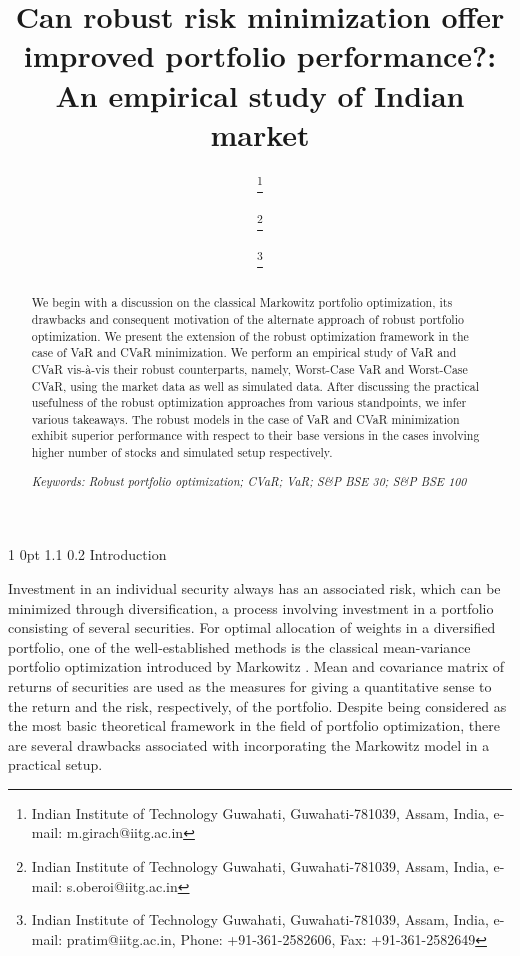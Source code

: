 \documentclass[12pt]{article}
\makeatletter
\numberwithin{equation}{section}
\renewcommand{\section}{
  \@startsection
  {section}%
  {1}%
  {0pt}%
  {1.1\baselineskip}%
  {0.2\baselineskip}%
  {\sc \centering}%
}
\makeatother
\begin{document}
\title{\large\sc Can robust risk minimization offer improved portfolio performance?: An empirical study of Indian market}
\normalsize

\author{ \thanks{Indian Institute of Technology Guwahati, Guwahati-781039, Assam, India, e-mail: m.girach@iitg.ac.in}
\and {} \thanks{Indian Institute of Technology Guwahati, Guwahati-781039, Assam, India, e-mail: s.oberoi@iitg.ac.in}
\and {} \thanks{Indian Institute of Technology Guwahati, Guwahati-781039, Assam, India, e-mail: pratim@iitg.ac.in,
Phone: +91-361-2582606, Fax: +91-361-2582649}}
\date{}
\maketitle
\begin{abstract}

We begin with a discussion on the classical Markowitz portfolio optimization, its drawbacks and consequent motivation of the alternate approach of robust portfolio optimization. We present the extension of the robust optimization framework in the case of VaR and CVaR minimization. We perform an empirical study of VaR and CVaR vis-\`a-vis their robust counterparts, namely, Worst-Case VaR and Worst-Case CVaR, using the market data as well as simulated data. After discussing the practical usefulness of the robust optimization approaches from various standpoints, we infer various takeaways. The robust models in the case of VaR and CVaR minimization exhibit superior performance with respect to their base versions in the cases involving higher number of stocks and simulated setup respectively.

{\it Keywords: Robust portfolio optimization; CVaR; VaR; S\&P BSE 30; S\&P BSE 100}

\end{abstract}

\section{Introduction}
\label{Introduction}

Investment in an individual security always has an associated risk, which can be minimized through diversification, a process involving  investment in a portfolio consisting of several securities. For optimal allocation of weights in a diversified portfolio, one of the well-established methods is the classical mean-variance portfolio optimization introduced by Markowitz \cite{Markowitz1,Markowitz2}. Mean and covariance matrix of returns of securities are used as the measures for giving a quantitative sense to the return and the risk, respectively, of the portfolio. Despite being considered as the most basic theoretical framework in the field of portfolio optimization, there are several drawbacks associated with incorporating the Markowitz model in a practical setup.
\end{document}
